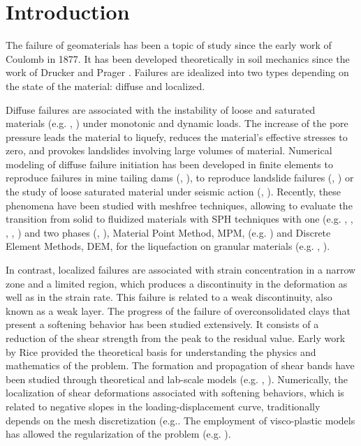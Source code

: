 \documentclass[applsci,journal,article,submit,moreauthors,pdftex]{Definitions/mdpi}
\begin{document}
\section{Introduction}
The failure of geomaterials has been a topic of study since the early work of Coulomb in 1877. It has been developed theoretically in soil mechanics since the work of Drucker and Prager \cite{Drucker-Prager}. Failures are idealized into two types depending on the state of the material: diffuse and localized.

Diffuse failures are associated with the instability of loose and saturated materials (e.g. \cite{DarveLaouafa2000}, \cite{Pastor2009b}) under monotonic and dynamic loads. The increase of the pore pressure leads the material to liquefy, reduces the material's effective stresses to zero, and provokes landslides involving large volumes of material. Numerical modeling of diffuse failure initiation has been developed in finite elements to reproduce failures in mine tailing dams (\cite{Ledesma2021}, \cite{Ledesma2022}), to reproduce landslide failures (\cite{Laouafa2002}, \cite{FernandezMerodo2004}) or the study of loose saturated material under seismic action (\cite{LopezQuerolB2006}, \cite{Manzanal2021}). Recently, these phenomena have been studied with meshfree techniques, allowing to evaluate the transition from solid to fluidized materials with SPH techniques with one (e.g. \cite{Pastor2009b}, \cite{Manzanal2016}, \cite{Dutto2017}, \cite{Longo2019}, \cite{Lin2019}) and two phases (\cite{Pastor2017}, \cite{Pastor2021}), Material Point Method, MPM, (e.g. \cite{Zaba2011,Yerro:2015,Yerro:2016}) and Discrete Element Methods, DEM, for the liquefaction on granular materials (e.g. \cite{Feng2021}, \cite{SIZKOW2021}).

In contrast, localized failures are associated with strain concentration in a narrow zone and a limited region, which produces a discontinuity in the deformation as well as in the strain rate. This failure is related to a weak discontinuity, also known as a weak layer. The progress of the failure of overconsolidated clays that present a softening behavior has been studied extensively. It consists of a reduction of the shear strength from the peak to the residual value. Early work by Rice \cite{Rice1973} provided the theoretical basis for understanding the physics and mathematics of the problem. The formation and propagation of shear bands have been studied through theoretical and lab-scale models (e.g. \cite{Desrues_1984}, \cite{Sulem1995}). Numerically, the localization of shear deformations associated with softening behaviors, which is related to negative slopes in the loading-displacement curve, traditionally depends on the mesh discretization (e.g.\cite{Wang:1997}. The employment of visco-plastic models has allowed the regularization of the problem (e.g. \cite{GutierreDeBort}).
\end{document}
